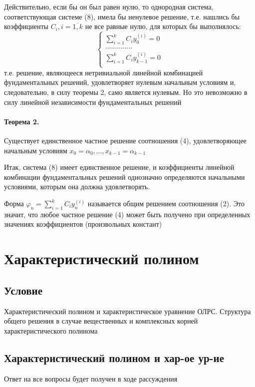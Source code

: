\documentclass{report}
\begin{document}
Действительно, если бы он был равен нулю, то однородная
система, соответствующая системе (8), имела бы ненулевое
решение, т.е. нашлись бы коэффициенты $C_{i}, i = \overline{1,k}$ не все
равные нулю, для которых бы выполнялось:
\[
\begin{cases}
	\sum_{i=1}^{k}C_{i}y_0^{(i)} = 0\\
	\ldots\ldots..\ldots\ldots\\
	\sum_{i=1}^{k}C_{i}y_{k-1}^{(i)} = 0\\
\end{cases}
\] 
т.е. решение, являющееся нетривиальной линейной комбинацией
фундаментальных решений, удовлетворяет нулевым начальным
условиям и, следовательно, в силу теоремы 2, само является
нулевым. Но это невозможно в силу линейной независимости
фундаментальных решений

\paragraph*{Теорема 2.}
Существует единственное частное решение
соотношения (4), удовлетворяющее начальным условиям
$x_0=\alpha_0, \ldots, x_{k-1} = \alpha_{k-1}$

\medskip

Итак, система (8) имеет единственное решение, и
коэффициенты линейной комбинации фундаментальных решений
однозначно определяются начальными условиями, которым она
должна удовлетворять.

\medskip

Форма $\varphi_{n} = \sum_{i=1}^{k}C_{i}y^{(i)}_{n} $ называется общим решением соотношения (2).
Это значит, что любое частное решение (4)
может быть получено при определенных значениях
коэффициентов (произвольных констант)

\newpage

\section{Характеристический полином}
\subsection{Условие}
Характеристический полином и характеристическое уравнение ОЛРС. Структура
общего решения в случае вещественных и комплексных корней характеристического
полинома

\subsection{Характеристический полином и хар-ое ур-ие}
Ответ на все вопросы будет получен в ходе рассуждения
\end{document}
